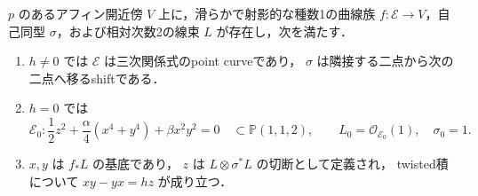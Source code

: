 \begin{lemma}
\label{lem:elliptic-resolved-point-curve}
$p$ のあるアフィン開近傍 $V$ 上に，滑らかで射影的な種数1の曲線族
$f:\mathcal E\to V$，自己同型 $\sigma$，および相対次数2の線束
$L$ が存在し，次を満たす．
\begin{enumerate}
 \item $h\ne0$ では $\mathcal E$ は三次関係式のpoint curveであり，
       $\sigma$ は隣接する二点から次の二点へ移るshiftである．
 \item $h=0$ では
       \[
        \mathcal E_0:
        \frac12z^2+\frac\alpha4(x^4+y^4)+\beta x^2y^2=0
        \quad\subset\mathbb P(1,1,2),
        \qquad L_0=\mathcal O_{\mathcal E_0}(1),\quad \sigma_0=1.
       \]
 \item $x,y$ は $f_*L$ の基底であり，
       $z$ は $L\otimes\sigma^*L$ の切断として定義され，
       twisted積について $xy-yx=hz$ が成り立つ．
\end{enumerate}
\end{lemma}
